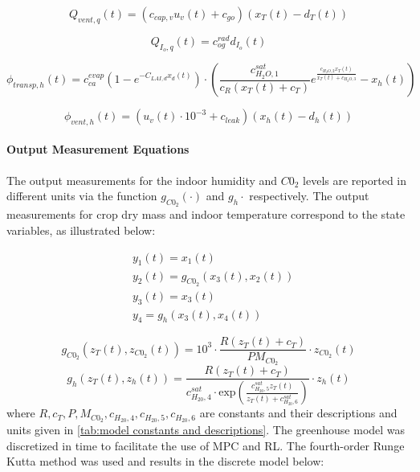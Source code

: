 \begin{equation}
	Q_{vent,q}(t) = (c_{cap,v}u_v(t) + c_{go})(x_T(t) - d_T(t))
	\label{heat exchange}
\end{equation}

\begin{equation}
	Q_{I_o,q}(t) = c_{og}^{rad} d_{I_o}(t)
\end{equation}

\begin{equation}
	\phi_{transp,h}(t) = c_{ca}^{evap}(1 - e^{-C_{LAI,d} x_d(t)})\cdot \left( \frac{c_{H_2O,1}^{sat}}{c_R(x_T(t)+c_T)} e^{\frac{c_{H_2O,2}x_T(t)}{x_T(t) + c_{H_2O,3}}} - x_h(t) \right)
\end{equation}

\begin{equation}
	\phi_{vent,h}(t) = (u_v(t) \cdot 10^{-3} + c_{leak})(x_h(t) - d_h(t))
\end{equation}

\paragraph{Output Measurement Equations}
The output measurements for the indoor humidity and $C0_2$ levels are reported in different units via the function $g_{C0_2}(\cdot)$ and $g_h{\cdot}$ respectively.  The output measurements for crop dry mass and indoor temperature correspond to the state variables, as illustrated below:

\begin{equation}
	\begin{aligned}
		& y_1(t) = x_1(t) 
		\\
		& y_{2}(t) = g_{C0_2}(x_3(t),x_{2}(t))
		\\
		& y_3 (t) = x_3(t)
		\\
		& y_{4} = g_h (x_3(t),x_4(t))
	\end{aligned}
\end{equation}

\begin{equation}
	g_{C0_2}(z_T(t),z_{C0_2}(t)) = 10^3 \cdot \frac{R(z_T(t) + c_T)}{PM_{C0_2}} \cdot z_{C0_2}(t)
\end{equation}
\begin{equation}
	g_h (z_T(t),z_h(t)) = \frac{R(z_T(t) + c_T)}{c_{H_20,4}^{sat}\cdot \text{exp}(\frac{c_{H_20,5}^{sat}z_T(t)}{z_T(t) + c_{H_20,6}^{sat}})} \cdot z_{h}(t)
\end{equation}
where $R,c_T,P,M_{C0_2},c_{H_20,4},c_{H_20,5},c_{H_20,6}$ are constants and their descriptions and units given in \autoref{tab:model constants and descriptions}. The greenhouse model was discretized in time to facilitate the use of MPC and RL. The fourth-order Runge Kutta method was used and results in the discrete model below:

